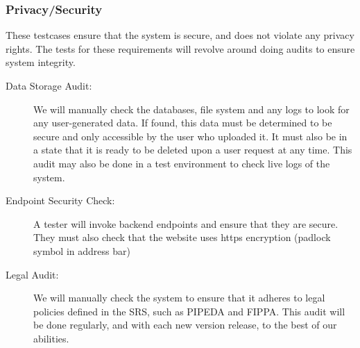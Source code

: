 \documentclass[12pt, titlepage]{article}
\begin{document}
\subsubsection{Privacy/Security}
These testcases ensure that the system is secure, and does not violate any
privacy rights. The tests for these requirements will revolve around doing
audits to ensure system integrity.

\begin{description}
  \item[Data Storage Audit:] We will manually check the databases, file system
  and any logs to look for any user-generated data. If found, this data must be
  determined to be secure and only accessible by the user who uploaded it. It
  must also be in a state that it is ready to be deleted upon a user request at
  any time.
  This audit may also be done in a test environment to check live logs of the
  system.
  \item[Endpoint Security Check:] A tester will invoke backend endpoints and
  ensure that they are secure. They must also check that the website uses https
  encryption (padlock symbol in address bar)
  \item[Legal Audit:] We will manually check the system to ensure that it
  adheres to legal policies defined in the SRS, such as PIPEDA and FIPPA. This
  audit will be done regularly, and with each new version release, to the best
  of our abilities.
\end{description}
\end{document}
